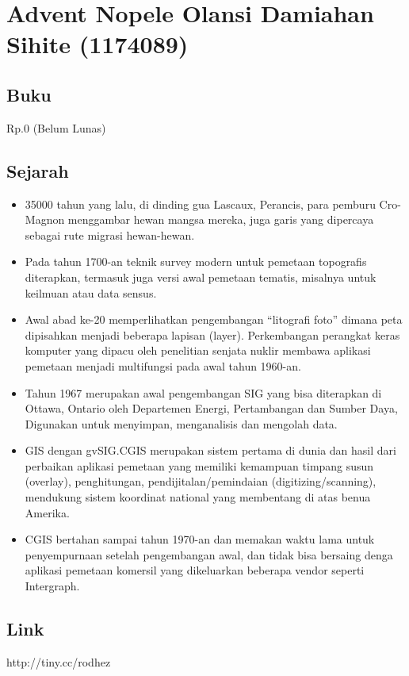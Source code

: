 \section{Advent Nopele Olansi Damiahan Sihite (1174089)}
\subsection{Buku}
Rp.0 (Belum Lunas)
\subsection{Sejarah}
\begin{itemize}

	\item35000 tahun yang lalu, di dinding gua Lascaux, Perancis, para pemburu Cro-Magnon menggambar hewan mangsa mereka, juga garis yang dipercaya sebagai rute migrasi hewan-hewan.
	\item	Pada tahun 1700-an teknik survey modern untuk pemetaan topografis diterapkan, termasuk juga versi awal pemetaan tematis, misalnya untuk keilmuan atau data sensus.
	\item	Awal abad ke-20 memperlihatkan pengembangan “litografi foto” dimana peta dipisahkan menjadi beberapa lapisan (layer). Perkembangan perangkat keras komputer yang dipacu oleh penelitian senjata nuklir membawa aplikasi pemetaan menjadi multifungsi pada awal tahun 1960-an.
	\item	Tahun 1967 merupakan awal pengembangan SIG yang bisa diterapkan di Ottawa, Ontario oleh Departemen Energi, Pertambangan dan Sumber Daya, Digunakan untuk menyimpan, menganalisis dan mengolah data.
	\item	GIS dengan gvSIG.CGIS merupakan sistem pertama di dunia dan hasil dari perbaikan aplikasi pemetaan yang memiliki kemampuan timpang susun (overlay), penghitungan, pendijitalan/pemindaian (digitizing/scanning), mendukung sistem koordinat national yang membentang di atas benua Amerika.
	\item	CGIS bertahan sampai tahun 1970-an dan memakan waktu lama untuk penyempurnaan setelah pengembangan awal, dan tidak bisa bersaing denga aplikasi pemetaan komersil yang dikeluarkan beberapa vendor seperti Intergraph.


\end{itemize}
\subsection{Link}
http://tiny.cc/rodhez
